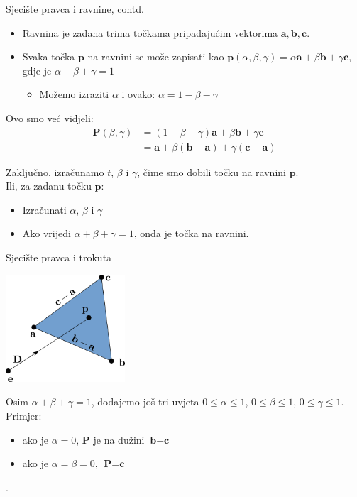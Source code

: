 \documentclass[9pt]{beamer}
\begin{document}
\begin{frame}{Sjecište pravca i ravnine, contd.}
	\begin{itemize}
		\item Ravnina je zadana trima točkama pripadajućim vektorima $\mathbf{a}, \mathbf{b}, \mathbf{c}$.
		\item Svaka točka $\mathbf{p}$ na ravnini se može zapisati kao  $\mathbf{p}(\alpha, \beta, \gamma) = \alpha\mathbf{a} + \beta\mathbf{b}+\gamma\mathbf{c}$, gdje je $\alpha + \beta +\gamma =1$
		\begin{itemize}
			\item Možemo izraziti $\alpha$ i ovako: $\alpha = 1- \beta - \gamma$
		\end{itemize}
	\end{itemize}

	Ovo smo već vidjeli:
	\begin{align*}
	\mathbf{P}(\beta, \gamma) & = (1- \beta - \gamma)\mathbf{a} + \beta\mathbf{b}+\gamma\mathbf{c} \\
	                          & = \mathbf{a} + \beta(\mathbf{b}-\mathbf{a}) + \gamma(\mathbf{c}-\mathbf{a})
	\end{align*}	
	
	Zaključno, izračunamo $t$, $\beta$ i $\gamma$, čime smo dobili točku na ravnini $\mathbf{p}$.\\
	Ili, za zadanu točku $\mathbf{p}$:
	\begin{itemize}
		\item Izračunati $\alpha$, $\beta$ i $\gamma$
		\item Ako vrijedi $\alpha + \beta +\gamma =1$, onda je točka na ravnini.
	\end{itemize}
\end{frame}

\begin{frame}{Sjecište pravca i trokuta}
	\begin{center}
		\includegraphics[height=4cm]{./slike/sjeciste_trokut_pravac.png}
	\end{center}
Osim $\alpha + \beta +\gamma =1$, dodajemo još tri uvjeta $0 \leq \alpha \leq 1$, $0 \leq \beta \leq 1$, $0 \leq \gamma \leq 1$.\\
Primjer: 
\begin{itemize}
	\item ako je $\alpha=0$, $\textbf{P}$ je na dužini $\textbf{b} - \textbf{c}$
	\item ako je $\alpha=\beta=0$, $\textbf{P} = \textbf{c}$
\end{itemize}

.
\end{frame}
\end{document}
